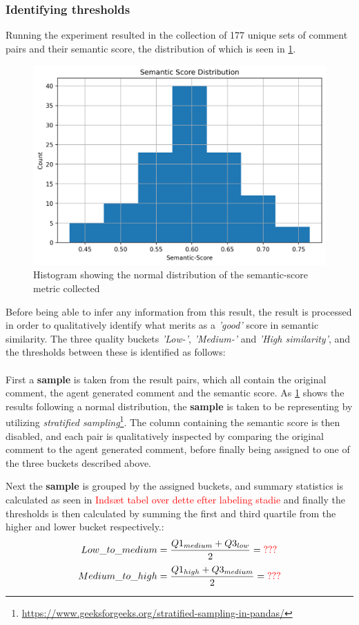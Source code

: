 \subsubsection{Identifying thresholds}
Running the experiment resulted in the collection of 177 unique sets of comment pairs and their semantic score, the distribution of which is seen in \cref{fig:sem_hist}.
\begin{figure}[H]
\centering
\includegraphics[width=0.7\linewidth]{Figures/semantic_score_histogram.png}
\caption{Histogram showing the normal distribution of the semantic-score metric collected}
\label{fig:sem_hist}
\end{figure}

Before being able to infer any information from this result, the result is processed in order to qualitatively identify what merits as a \textit{'good'} score in semantic similarity. The three quality buckets \textit{'Low-'}, \textit{'Medium-'} and \textit{'High similarity'}, and the thresholds between these is identified as follows:
\\\\
First a \textbf{sample} is taken from the result pairs, which all contain the original comment, the agent generated comment and the semantic score. As \cref{fig:sem_hist} shows the results following a normal distribution, the \textbf{sample} is taken to be representing by utilizing \textit{stratified sampling}\footnote{\url{https://www.geeksforgeeks.org/stratified-sampling-in-pandas/}}. The column containing the semantic score is then disabled, and each pair is qualitatively inspected by comparing the original comment to the agent generated comment, before finally being assigned to one of the three buckets described above. 

Next the \textbf{sample} is grouped by the assigned buckets, and summary statistics is calculated as seen in \textcolor{red}{Indsæt tabel over dette efter labeling stadie} and finally the thresholds is then calculated by summing the first and third quartile from the higher and lower bucket respectively.:
\[
Low\_to\_medium = \frac{Q1_{medium}+Q3_{low}}{2} = \textcolor{red}{???}
\]
\[
Medium\_to\_high = \frac{Q1_{high}+Q3_{medium}}{2} = \textcolor{red}{???}
\]

